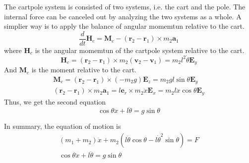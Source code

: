 The cartpole system is consisted of two systems, i.e. the cart and the pole. The internal force can be canceled out by analyzing the two systems as a whole. A simplier way is to apply the balance of angular momemtun relative to the cart.
\begin{equation}
    \frac{d}{dt}\mathbf{H}_c = \mathbf{M}_c - (\mathbf{r}_2-\mathbf{r}_1)\times m_2\mathbf{a}_1
\end{equation}
where $\mathbf{H}_c$ is the angular momemtun of the cartpole system relative to the cart.
\begin{equation}
    \mathbf{H}_c = (\mathbf{r}_2-\mathbf{r}_1) \times m_2(\mathbf{v}_2 - \mathbf{v}_1) = m_2l^2\dot{\theta}\mathbf{E}_y
\end{equation}
And $\mathbf{M}_c$ is the moment relative to the cart.
\begin{align}
    \mathbf{M}_c = (\mathbf{r}_2-\mathbf{r}_1) \times (-m_2g)\mathbf{E}_z = m_2gl\sin\theta\mathbf{E}_y\\
    (\mathbf{r}_2-\mathbf{r}_1)\times m_2\mathbf{a}_1 = l\mathbf{e}_r \times m_2\ddot{x}\mathbf{E}_x = m_2l\ddot{x}\cos\theta\mathbf{E}_y
\end{align}
Thus, we get the second equation
\begin{equation}
    \cos\theta\ddot{x} + l\ddot{\theta} = g\sin\theta
\end{equation}

In summary, the equation of motion is
\begin{align}
    (m_1+m_2)\ddot{x} + m_2(l\ddot{\theta}\cos\theta - l\dot{\theta}^2\sin\theta) = F\\
    \cos\theta\ddot{x} + l\ddot{\theta} = g\sin\theta
\end{align}


